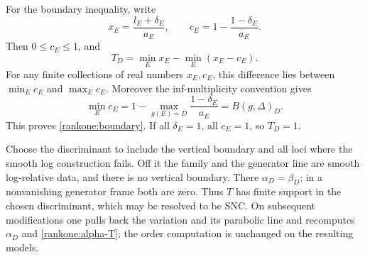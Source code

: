 For the boundary inequality, write
\[
 x_E=\frac{l_E+\delta_E}{a_E},\qquad
 c_E=1-\frac{1-\delta_E}{a_E}.
\]
Then $0\leq c_E\leq1$, and
\[
 T_D=\min_E x_E-\min_E(x_E-c_E).
\]
For any finite collections of real numbers $x_E,c_E$, this
difference lies between $\min_Ec_E$ and $\max_Ec_E$.
Moreover the inf-multiplicity convention gives
\[
 \min_Ec_E
 =1-\max_{g(E)=D}\frac{1-\delta_E}{a_E}
 =B(g,\Delta)_D.
\]
This proves \eqref{rankone:boundary}.  If all $\delta_E=1$,
all $c_E=1$, so $T_D=1$.

Choose the discriminant to include the vertical boundary and all
loci where the smooth log construction fails.  Off it the family
and the generator line are smooth log-relative data, and there is
no vertical boundary.  There $\alpha_D=\beta_D$; in a
nonvanishing generator frame both are zero.  Thus $T$ has finite
support in the chosen discriminant, which may be resolved to be
SNC.  On subsequent modifications one pulls back the variation and
its parabolic line and recomputes $\alpha_D$ and
\eqref{rankone:alpha-T}; the order computation is unchanged on the
resulting models.

